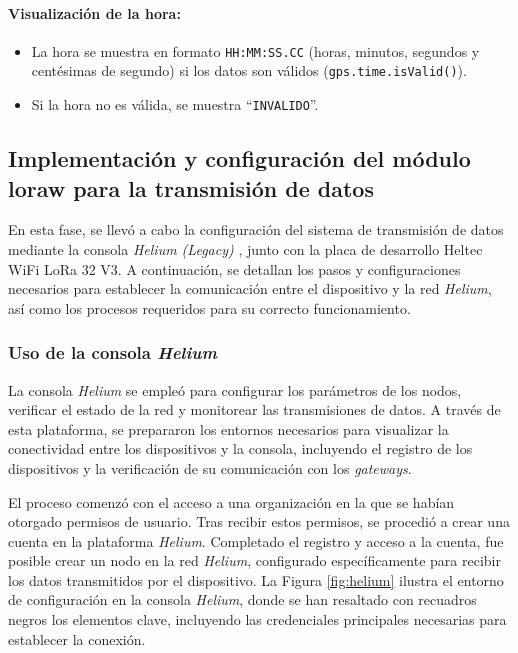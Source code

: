 \paragraph{Visualización de la hora:}
\begin{itemize}
    \item La hora se muestra en formato \texttt{HH:MM:SS.CC} (horas, minutos, segundos y centésimas de segundo) si los datos son válidos (\texttt{gps.time.isValid()}).
    \item Si la hora no es válida, se muestra “\texttt{INVALIDO}”.
\end{itemize}



\subsection{Implementación y configuración del módulo \acrshort{loraw} para la transmisión de datos}

En esta fase, se llevó a cabo la configuración del sistema de transmisión de datos mediante la consola \textit{Helium (Legacy)} \cite{Helium_Console}, junto con la placa de desarrollo Heltec WiFi LoRa 32 V3. A continuación, se detallan los pasos y configuraciones necesarios para establecer la comunicación entre el dispositivo y la red \textit{Helium}, así como los procesos requeridos para su correcto funcionamiento.

\subsubsection{Uso de la consola \textit{Helium}}
La consola \textit{Helium} se empleó para configurar los parámetros de los nodos, verificar el estado de la red y monitorear las transmisiones de datos. A través de esta plataforma, se prepararon los entornos necesarios para visualizar la conectividad entre los dispositivos y la consola, incluyendo el registro de los dispositivos y la verificación de su comunicación con los \textit{gateways}.

El proceso comenzó con el acceso a una organización en la que se habían otorgado permisos de usuario. Tras recibir estos permisos, se procedió a crear una cuenta en la plataforma \textit{Helium}. Completado el registro y acceso a la cuenta, fue posible crear un nodo en la red \textit{Helium}, configurado específicamente para recibir los datos transmitidos por el dispositivo. La Figura \ref{fig:helium} ilustra el entorno de configuración en la consola \textit{Helium}, donde se han resaltado con recuadros negros los elementos clave, incluyendo las credenciales principales necesarias para establecer la conexión.

